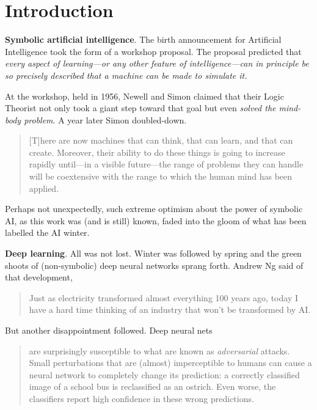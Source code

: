 

\section{Introduction}

\noindent\textbf{Symbolic artificial intelligence}. The birth announcement for Artificial Intelligence took the form of a workshop proposal. The proposal predicted that \textit{every aspect of learning---or any other feature of intelligence---can in principle be so precisely described that a machine can be made to simulate it.}\cite{mccarthy2006proposal}  

At the workshop, held in 1956, Newell and Simon claimed that their Logic Theorist not only took a giant step toward that goal but even \textit{solved the mind-body problem}.\cite{russell2010artificial} A year later Simon doubled-down.
\begin{quote}
    [T]here are now machines that can think, that can learn, and that can create. Moreover, their ability to do these things is going to increase rapidly until---in a visible future---the range of problems they can handle will be coextensive with the range to which the human mind has been applied.\cite{simon1957models}
\end{quote}

Perhaps not unexpectedly, such extreme optimism about the power of symbolic AI, as this work was (and is still) known, faded into the gloom of what has been labelled the AI winter. 

\smallv\noindent\textbf{Deep learning}. All was not lost. Winter was followed by spring and the green shoots of (non-symbolic) deep neural networks sprang forth. Andrew Ng said of that development, 
\begin{quote}
Just as electricity transformed almost everything 100 years ago, today I have a hard time thinking of an industry that won't be transformed by AI.\cite{ng2018ai}
\end{quote}

But another disappointment followed. Deep neural nets 
\begin{quote}
are surprisingly susceptible to what are known as \textit{adversarial} attacks. Small perturbations that are (almost) imperceptible to humans can cause a neural network to completely change its prediction: a correctly classified image of a school bus is reclassified as an ostrich. Even worse, the classifiers report high confidence in these wrong predictions.\cite{akhtar2018threat}
\end{quote}

